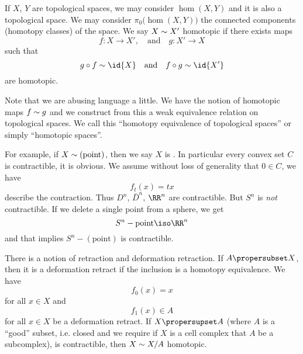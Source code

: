 
If $X$, $Y$ are topological spaces, we may consider $\hom(X,Y)$
and it is also a topological space. We may consider
$\pi_{0}\bigl(\hom(X,Y)\bigr)$ the connected components (homotopy
classes) of the space. We say $X\sim X'$ homotopic if there
exists maps
\begin{equation}
f\colon X\to X',\quad\mbox{and}\quad
g\colon X'\to X
\end{equation}
such that
\begin{equation}
g\circ f\homotopic\id{X}\quad\mbox{and}\quad
f\circ g\homotopic\id{X'}
\end{equation}
are homotopic.

\begin{ddanger}
Note that we are abusing language a little. We have the notion of
homotopic maps $f\sim g$ and we construct from this a weak
equivalence relation on topological spaces. We call this
``homotopy equivalence of topological spaces'' or simply
``homotopic spaces''.
\end{ddanger}

For example, if $X\sim(\mbox{point})$, then we say $X$ is
. In
particular every convex set $C$ is contractible, it is obvious. We
assume without loss of generality that $0\in C$, we have
\begin{equation}
f_{t}(x)=tx
\end{equation}
describe the contraction. Thus $D^n$, $\bar{D}^n$, $\RR^n$ are
contractible. But $S^{n}$ is \emph{not} contractible.
If we delete a single point from a sphere, we get
\begin{equation}
S^{n}-\mbox{point}\iso\RR^{n}
\end{equation}
and that implies $S^{n}-(\mbox{point})$ is contractible.

There is a notion of retraction and deformation retraction. If
$A\propersubset X$, then it is a deformation retract if the
inclusion is a homotopy equivalence. We have
\begin{equation}
f_{0}(x)=x
\end{equation}
for all $x\in X$ and
\begin{equation}
f_{1}(x)\in A
\end{equation}
for all $x\in X$ be a deformation retract. If $X\propersupset A$
(where $A$ is a ``good'' subset, i.e. closed and we require if
$X$ is a cell complex that $A$ be a subcomplex), is contractible,
then $X\sim X/A$ homotopic.

